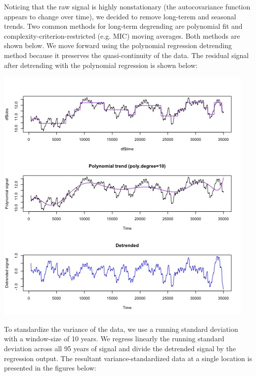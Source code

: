 \documentclass[11pt]{article}
\begin{document}
Noticing that the raw signal is highly nonstationary (the autocovariance
function appears to change over time), we decided to remove long-terem and
seasonal trends. Two common methods for long-term degrending are polynomial fit
and complexity-criterion-restricted (e.g. MIC) moving averages. Both methods are
shown below. We move forward using the polynomial regression detrending method
because it preserves the quasi-continuity of the data. The residual signal after
detrending with the polynomial regression is shown below:

\includegraphics[width=\textwidth]{../img/detrended_acf_pacf.png}

To standardize the variance of the data, we use a running standard deviation
with a window-size of 10 years. We regress linearly the running standard
deviation across all 95 years of signal and divide the detrended signal by the
regression output. The resultant variance-standardized data at a single location
is presented in the figures below:
\end{document}
